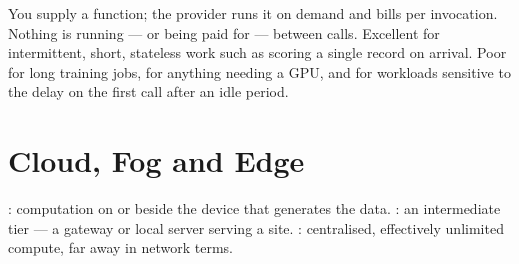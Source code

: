 \begin{conceptbox}[Serverless]
You supply a function; the provider runs it on demand and bills per invocation.
Nothing is running --- or being paid for --- between calls. Excellent for
intermittent, short, stateless work such as scoring a single record on arrival.
Poor for long training jobs, for anything needing a GPU, and for workloads
sensitive to the  delay on the first call after an idle period.
\end{conceptbox}

\section{Cloud, Fog and Edge}

\begin{definitionbox}
: computation on or beside the device that generates the data.
: an intermediate tier --- a gateway or local server serving a site.
: centralised, effectively unlimited compute, far away in network terms.
\end{definitionbox}

